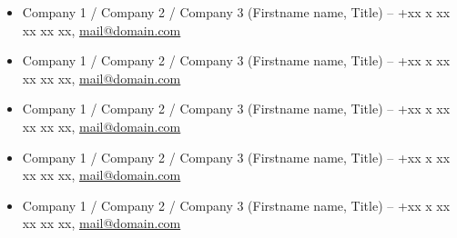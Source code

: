 
\begin{itemize}
    \item Company 1 / Company 2 / Company 3 (Firstname name, Title) -- +xx x xx xx xx xx, \href{mailto:mail@domain.com}{mail@domain.com}
    \item Company 1 / Company 2 / Company 3 (Firstname name, Title) -- +xx x xx xx xx xx, \href{mailto:mail@domain.com}{mail@domain.com}
    \item Company 1 / Company 2 / Company 3 (Firstname name, Title) -- +xx x xx xx xx xx, \href{mailto:mail@domain.com}{mail@domain.com}
    \item Company 1 / Company 2 / Company 3 (Firstname name, Title) -- +xx x xx xx xx xx, \href{mailto:mail@domain.com}{mail@domain.com}
    \item Company 1 / Company 2 / Company 3 (Firstname name, Title) -- +xx x xx xx xx xx, \href{mailto:mail@domain.com}{mail@domain.com}
\end{itemize}
